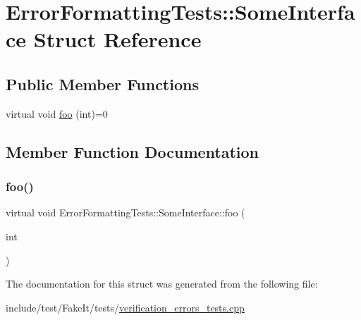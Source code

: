 \hypertarget{structErrorFormattingTests_1_1SomeInterface}{}\section{Error\+Formatting\+Tests\+::Some\+Interface Struct Reference}
\label{structErrorFormattingTests_1_1SomeInterface}
\subsection*{Public Member Functions}
\begin{DoxyCompactItemize}
\item 
virtual void \mbox{\hyperlink{structErrorFormattingTests_1_1SomeInterface_ae39f49ab77c1fd49955e39400d24ace0}{foo}} (int)=0
\end{DoxyCompactItemize}


\subsection{Member Function Documentation}
\mbox{\label{structErrorFormattingTests_1_1SomeInterface_ae39f49ab77c1fd49955e39400d24ace0}} 
\subsubsection{\texorpdfstring{foo()}{foo()}}
{\footnotesize\ttfamily virtual void Error\+Formatting\+Tests\+::\+Some\+Interface\+::foo (\begin{DoxyParamCaption}\item[{int}]{ }\end{DoxyParamCaption})\hspace{0.3cm}{\ttfamily [pure virtual]}}



The documentation for this struct was generated from the following file\+:\begin{DoxyCompactItemize}
\item 
include/test/\+Fake\+It/tests/\mbox{\hyperlink{verification__errors__tests_8cpp}{verification\+\_\+errors\+\_\+tests.\+cpp}}\end{DoxyCompactItemize}
